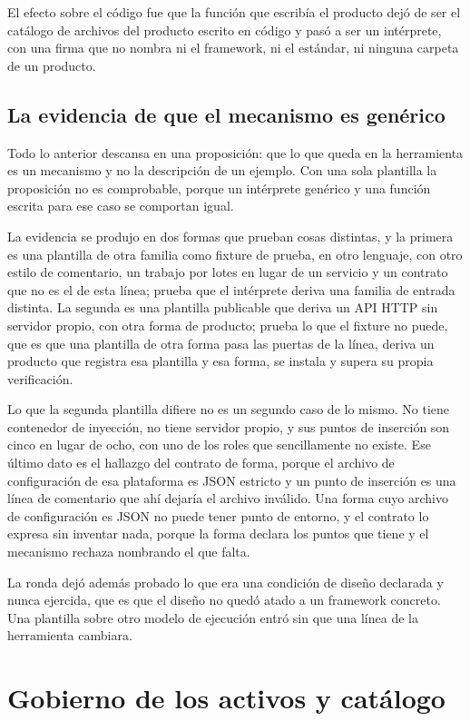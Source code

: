 El efecto sobre el código fue que la función que escribía el producto dejó de
ser el catálogo de archivos del producto escrito en código y pasó a ser un
intérprete, con una firma que no nombra ni el framework, ni el estándar, ni
ninguna carpeta de un producto.

\subsection{La evidencia de que el mecanismo es genérico}

Todo lo anterior descansa en una proposición: que lo que queda en la
herramienta es un mecanismo y no la descripción de un ejemplo. Con una sola
plantilla la proposición no es comprobable, porque un intérprete genérico y
una función escrita para ese caso se comportan igual.

La evidencia se produjo en dos formas que prueban cosas distintas, y la primera
es una plantilla de otra familia como fixture de prueba, en otro lenguaje,
con otro estilo de comentario, un trabajo por lotes en lugar de un servicio y
un contrato que no es el de esta línea; prueba que el intérprete deriva una
familia de entrada distinta. La segunda es una plantilla publicable que
deriva un API HTTP sin servidor propio, con otra forma de producto; prueba lo
que el fixture no puede, que es que una plantilla de otra forma pasa las
puertas de la línea, deriva un producto que registra esa plantilla y esa
forma, se instala y supera su propia verificación.

Lo que la segunda plantilla difiere no es un segundo caso de lo mismo. No
tiene contenedor de inyección, no tiene servidor propio, y sus puntos de
inserción son cinco en lugar de ocho, con uno de los roles que sencillamente
no existe. Ese último dato es el hallazgo del contrato de forma, porque el
archivo de configuración de esa plataforma es JSON estricto y un punto de
inserción es una línea de comentario que ahí dejaría el archivo inválido. Una
forma cuyo archivo de configuración es JSON no puede tener punto de entorno, y
el contrato lo expresa sin inventar nada, porque la forma declara los puntos
que tiene y el mecanismo rechaza nombrando el que falta.

La ronda dejó además probado lo que era una condición de diseño declarada y
nunca ejercida, que es que el diseño no quedó atado a un framework concreto.
Una plantilla sobre otro modelo de ejecución entró sin que una línea de la
herramienta cambiara.

\section{Gobierno de los activos y catálogo}
\label{sec:gobierno-activos}

